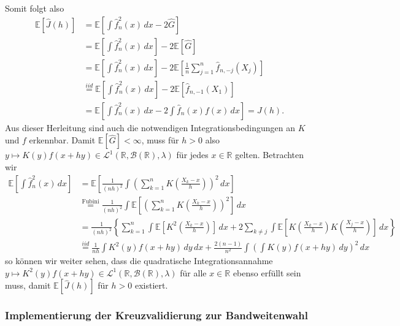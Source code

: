 \documentclass[10pt,]{article}
\begin{document}
Somit folgt also \[
\begin{aligned}
\mathbb{E} [\hat{J}(h)] &= \mathbb{E} \left[ \int \hat{f}_n^2(x) \, dx - 2 \hat{G} \right] \\
&= \mathbb{E} \left[ \int \hat{f}_n^2(x) \, dx \right] - 2 \mathbb{E}[\hat{G}] \\
&= \mathbb{E} \left[ \int \hat{f}_n^2(x) \, dx \right] - 2 \mathbb{E}\left[ \frac{1}{n} \sum_{j=1}^n \hat{f}_{n,-j}(X_j) \right] \\
&\overset{iid}{=} \mathbb{E} \left[ \int \hat{f}_n^2(x) \, dx \right] - 2 \mathbb{E}\left[ \hat{f}_{n,-1}(X_1) \right] \\
&= \mathbb{E} \left[ \int \hat{f}_n^2(x) \, dx - 2 \int \hat{f}_n(x) f(x) \, dx \right] = J(h).
\end{aligned}
\] Aus dieser Herleitung sind auch die notwendigen
Integrationsbedingungen an \(K\) und \(f\) erkennbar. Damit
\(\mathbb{E}[\hat{G}] < \infty\), muss für \(h>0\) also
\(y \mapsto K(y)f(x+hy) \in \mathcal{L}^1(\mathbb{R}, \mathcal{B}(\mathbb{R}), \lambda)\)
für jedes \(x \in \mathbb{R}\) gelten. Betrachten wir \[
\begin{aligned}
\mathbb{E} \left[ \int \hat{f}_n^2(x) \, dx \right] &= \mathbb{E} \left[ \frac{1}{(nh)^2} \int \left( \sum_{k=1}^n K\left( \frac{X_k-x}{h} \right) \right)^2 \, dx \right] \\
&\overset{\text{Fubini}}{=} \frac{1}{(nh)^2} \int \mathbb{E} \left[ \left( \sum_{k=1}^n K\left( \frac{X_k-x}{h} \right) \right)^2 \right] \, dx \\
&= \frac{1}{(nh)^2} \left\{ \sum_{k=1}^n \int \mathbb{E} \left[ K^2\left( \frac{X_k-x}{h} \right) \right] \, dx + 2 \sum_{k \not= j} \int \mathbb{E} \left[ K\left( \frac{X_k-x}{h} \right) K\left( \frac{X_j-x}{h} \right) \right] \, dx \right\} \\
&\overset{iid}{=} \frac{1}{nh} \int K^2(y) f(x+hy) \, dy \, dx + \frac{2(n-1)}{n^2} \int \left( \int K(y) f(x+hy) \, dy \right)^2 \, dx
\end{aligned}
\] so können wir weiter sehen, dass die quadratische Integrationsannahme
\(y \mapsto K^2(y) f(x+hy) \in \mathcal{L}^1(\mathbb{R}, \mathcal{B}(\mathbb{R}), \lambda)\)
für alle \(x \in \mathbb{R}\) ebenso erfüllt sein muss, damit
\(\mathbb{E}[\hat{J}(h)]\) für \(h>0\) existiert.

\subsubsection{Implementierung der Kreuzvalidierung zur
Bandweitenwahl}\label{implementierung-der-kreuzvalidierung-zur-bandweitenwahl}
\end{document}
